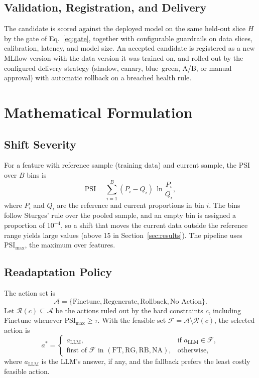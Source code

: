 \documentclass[conference]{IEEEtran}
\begin{document}
\subsection{Validation, Registration, and Delivery}
The candidate is scored against the deployed model on the same held-out slice $H$ by the gate of
Eq.~\eqref{eq:gate}, together with configurable guardrails on data slices, calibration,
latency, and model size. An accepted candidate is registered as a new MLflow version with the data version it was
trained on, and rolled out by the configured delivery strategy (shadow, canary, blue--green, A/B,
or manual approval) with automatic rollback on a breached health rule.

\section{Mathematical Formulation}

\subsection{Shift Severity}
For a feature with reference sample (training data) and current sample, the PSI over $B$ bins is
\begin{equation}
\mathrm{PSI} = \sum_{i=1}^{B} (P_i - Q_i)\,\ln\frac{P_i}{Q_i},
\label{eq:psi}
\end{equation}
where $P_i$ and $Q_i$ are the reference and current proportions in bin $i$. The bins follow
Sturges' rule over the pooled sample, and an empty bin is assigned a proportion of $10^{-4}$, so
a shift that moves the current data outside the reference range yields large values (above 15 in
Section~\ref{sec:results}). The pipeline uses $\mathrm{PSI}_{\max}$, the maximum over features.

\subsection{Readaptation Policy}
The action set is
\begin{equation}
\mathcal{A} = \{\text{Finetune}, \text{Regenerate}, \text{Rollback}, \text{No Action}\}.
\label{eq:actions}
\end{equation}
Let $\mathcal{R}(c)\subseteq\mathcal{A}$ be the actions ruled out by the hard constraints $c$,
including Finetune whenever $\mathrm{PSI}_{\max} \ge \tau$. With the feasible set
$\mathcal{F} = \mathcal{A}\setminus\mathcal{R}(c)$, the selected action is
\begin{equation}
a^{*} =
\begin{cases}
a_{\mathrm{LLM}}, & \text{if } a_{\mathrm{LLM}} \in \mathcal{F},\\
\text{first of } \mathcal{F} \text{ in } (\text{FT}, \text{RG}, \text{RB}, \text{NA}), & \text{otherwise},
\end{cases}
\label{eq:rule}
\end{equation}
where $a_{\mathrm{LLM}}$ is the LLM's answer, if any, and the fallback prefers the least costly
feasible action.
\end{document}
